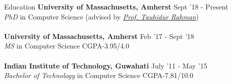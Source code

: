 \documentclass{resume} %
\begin{document}
\vspace*{-1mm}
\begin{rSection}{Education}
{\bf University of Massachusetts, Amherst} \hfill {Sept '18 - Present} \\ \textit{PhD} in Computer Science (advised by \textit{\href{http://www.tauhidurrahman.com/}{Prof. Tauhidur Rahman}}) \\\\
{\bf University of Massachusetts, Amherst} \hfill {Feb '17 - Sept '18} \\ \textit{MS} in Computer Science \hfill CGPA-3.95/4.0 \\\\
{\bf Indian Institute of Technology, Guwahati} \hfill {July '11 - May '15} \\ 
\textit{Bachelor of Technology} in  Computer Science \hfill CGPA-7.81/10.0 \\
\end{rSection}
\end{document}
